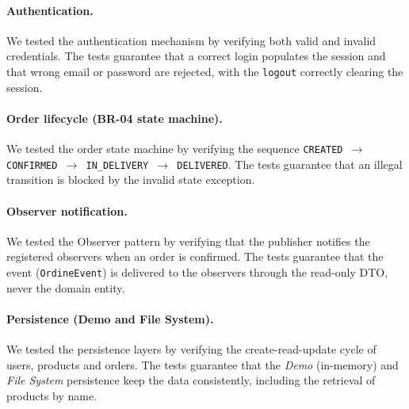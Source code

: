\paragraph{Authentication.} We tested the authentication mechanism by
verifying both valid and invalid credentials. The tests guarantee that a
correct login populates the session and that wrong email or password are
rejected, with the \texttt{logout} correctly clearing the session.

\paragraph{Order lifecycle (BR-04 state machine).} We tested the order state
machine by verifying the sequence \texttt{CREATED
$\rightarrow$ CONFIRMED $\rightarrow$ IN\_DELIVERY $\rightarrow$ DELIVERED}.
The tests guarantee that an illegal transition is blocked by the invalid state
exception.

\paragraph{Observer notification.} We tested the Observer pattern by verifying
that the publisher notifies the registered observers when an order is
confirmed. The tests guarantee that the event (\texttt{OrdineEvent}) is
delivered to the observers through the read-only DTO, never the domain entity.

\paragraph{Persistence (Demo and File System).} We tested the persistence
layers by verifying the create-read-update cycle of users, products and
orders. The tests guarantee that the \emph{Demo} (in-memory) and
\emph{File System} persistence keep the data consistently, including the
retrieval of products by name.
